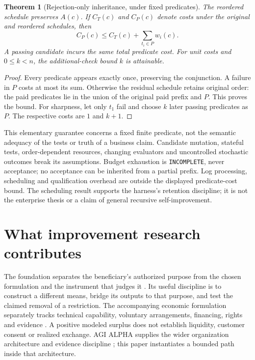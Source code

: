 \documentclass[11pt,letterpaper]{article}
\newtheorem{theorem}[proposition]{Theorem}
\begin{document}
\begin{theorem}[Rejection-only inheritance, under fixed predicates]
The reordered schedule preserves $A(c)$. If $C_T(c)$ and $C_P(c)$ denote costs under the original and reordered schedules, then
\[
C_P(c)\leq C_T(c)+\sum_{t_i\in P}w_i(c).
\]
A passing candidate incurs the same total predicate cost. For unit costs and $0\leq k<n$, the additional-check bound $k$ is attainable.
\end{theorem}
\begin{proof}
Every predicate appears exactly once, preserving the conjunction. A failure in $P$ costs at most its sum. Otherwise the residual schedule retains original order: the paid predicates lie in the union of the original paid prefix and $P$. This proves the bound. For sharpness, let only $t_1$ fail and choose $k$ later passing predicates as $P$. The respective costs are $1$ and $k+1$.
\end{proof}

This elementary guarantee concerns a fixed finite predicate, not the semantic adequacy of the tests or truth of a business claim. Candidate mutation, stateful tests, order-dependent resources, changing evaluators and uncontrolled stochastic outcomes break its assumptions. Budget exhaustion is \texttt{INCOMPLETE}, never acceptance; no acceptance can be inherited from a partial prefix. Log processing, scheduling and qualification overhead are outside the displayed predicate-cost bound. The scheduling result supports the harness's retention discipline; it is not the enterprise thesis or a claim of general recursive self-improvement.

\section{What improvement research contributes}
\label{sec:related}
The foundation separates the beneficiary's authorized purpose from the chosen formulation and the instrument that judges it \cite{ti}. Its useful discipline is to construct a different means, bridge its outputs to that purpose, and test the claimed removal of a restriction. The accompanying economic formulation separately tracks technical capability, voluntary arrangements, financing, rights and evidence \cite{economy}. A positive modeled surplus does not establish liquidity, customer consent or realized exchange. AGI ALPHA supplies the wider organization architecture and evidence discipline \cite{alpha}; this paper instantiates a bounded path inside that architecture.
\end{document}

